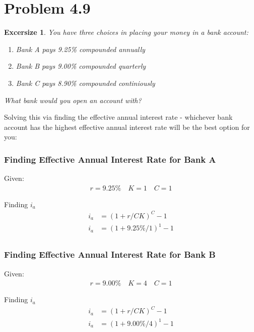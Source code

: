 \documentclass{report} %
\newtheorem{exrc}{Excersize}
\begin{document}
\section*{Problem 4.9}
\begin{exrc}
    You have three choices in placing your money in a bank account:
    \begin{enumerate}
        \item Bank A pays 9.25\% compounded annually
        \item Bank B pays 9.00\% compounded quarterly
        \item Bank C pays 8.90\% compounded continiously
    \end{enumerate}
    What bank would you open an account with?
\end{exrc}
Solving this via finding the effective annual interest rate - whichever bank account has the highest effective annual interest rate will be the best option for you:
\subsubsection*{Finding Effective Annual Interest Rate for Bank A}
Given:
\begin{equation*}
    \begin{aligned}
        r = 9.25\% \quad K = 1 \quad C = 1
    \end{aligned}
\end{equation*}

\noindent
Finding $i_a$
\begin{equation*}
    \begin{aligned}
        i_a &= (1 + r/CK)^C - 1 \\
        i_a &= (1 + 9.25\%/1)^1 - 1 \\
    \end{aligned}
\end{equation*}

\subsubsection*{Finding Effective Annual Interest Rate for Bank B}
Given:
\begin{equation*}
    \begin{aligned}
        r = 9.00\% \quad K = 4 \quad C = 1
    \end{aligned}
\end{equation*}

\noindent
Finding $i_a$
\begin{equation*}
    \begin{aligned}
        i_a &= (1 + r/CK)^C - 1 \\
        i_a &= (1 + 9.00\%/4)^1 - 1 \\
    \end{aligned}
\end{equation*}
\end{document}
